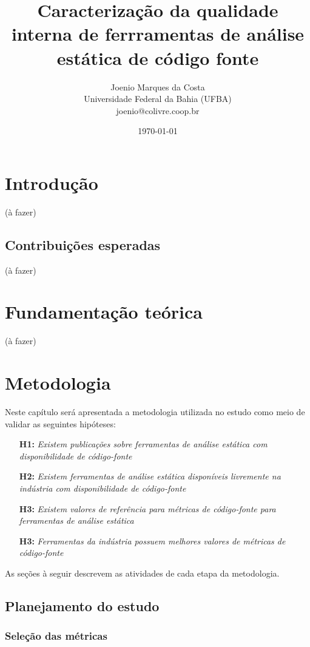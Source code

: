 \documentclass[12pt]{article}
\title{
  Caracterização da qualidade interna de ferrramentas de análise estática de
  código fonte
}
\author{Joenio Marques da Costa\\
  {\small Universidade Federal da Bahia (UFBA)} \\
  {\small joenio@colivre.coop.br}
}
\date{\today}
\begin{document}
\maketitle

\section{Introdução}

(à fazer)

\subsection{Contribuições esperadas}

(à fazer)

\section{Fundamentação teórica}

(à fazer)

\section{Metodologia}

Neste capítulo será apresentada a metodologia utilizada no estudo como meio
de validar as seguintes hipóteses:

\begin{enumerate}
  \item[{\bf H1:}] {\em Existem publicações sobre ferramentas de análise estática com
    disponibilidade de código-fonte}
  \item[{\bf H2:}] {\em Existem ferramentas de análise estática disponíveis livremente na
    indústria com disponibilidade de código-fonte}
  \item[{\bf H3:}] {\em Existem valores de referência para métricas de código-fonte para
    ferramentas de análise estática}
  \item[{\bf H3:}] {\em Ferramentas da indústria possuem melhores valores de
    métricas de código-fonte}
\end{enumerate}

As seções à seguir descrevem as atividades de cada etapa da metodologia.

\subsection{Planejamento do estudo}

\subsubsection{Seleção das métricas}
\end{document}
